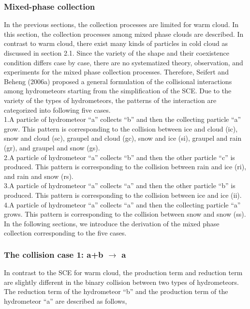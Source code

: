 \subsubsection{Mixed-phase collection}
In the previous sections, the collection processes are limited for warm cloud. In this section, the collection processes among mixed phase clouds are described. In contrast to warm cloud, there exist many kinds of particles in cold cloud as discussed in section 2.1. Since the variety of the shape and their coexistence condition differs case by case, there are no systematized theory, observation, and experiments for the mixed phase collection processes. Therefore, Seifert and Beheng (2006a) proposed a general formulation of the collisional interactions among hydrometeors starting from the simplification of the SCE. Due to the variety of the types of hydrometeors, the patterns of the interaction are categorized into following five cases.\\
1.A particle of hydrometeor “a” collects “b” and then the collecting particle “a” grow. This pattern is corresponding to the collision between ice and cloud (ic), snow and cloud (sc), graupel and cloud (gc), snow and ice (si), graupel and rain (gr), and graupel and snow (gs).\\
2.A particle of hydrometeor “a” collects “b” and then the other particle “c” is produced. This pattern is corresponding to the collision between rain and ice (ri), and rain and snow (rs).\\
3.A particle of hydrometeor “a” collects “a” and then the other particle “b” is produced. This pattern is corresponding to the collision between ice and ice (ii).\\
4.A particle of hydrometeor “a” collects “a” and then the collecting particle “a” grows. This pattern is corresponding to the collision between snow and snow (ss).\\
In the following sections, we introduce the derivation of the mixed phase collection corresponding to the five cases.

\subsubsection{The collision case 1: a+b $\rightarrow$ a}
In contrast to the SCE for warm cloud, the production term and reduction term are slightly different in the binary collision between two types of hydrometeors. The reduction term of the hydrometeor “b” and the production term of the hydrometeor “a” are described as follows,

